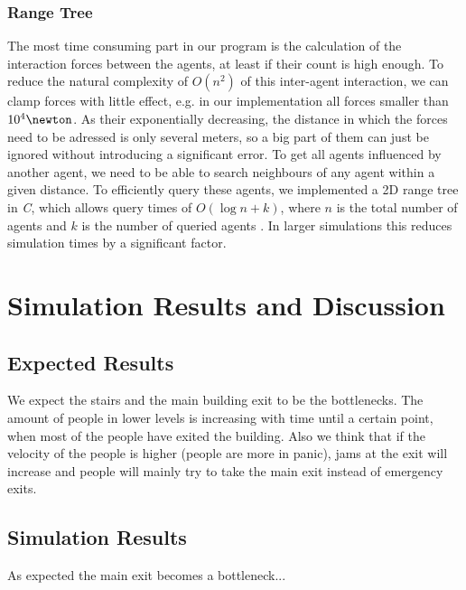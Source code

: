 \documentclass[11pt]{article}
\begin{document}
\subsubsection{Range Tree}
The most time consuming part in our program is the calculation of the interaction forces between the agents, at least if their count is high enough. To reduce the natural complexity of $O(n^{2})$ of this inter-agent interaction, we can clamp forces with little effect, e.g. in our implementation all forces smaller than $ 10^{4}\newton$. As their exponentially decreasing, the distance in which the forces need to be adressed is only several meters, so a big part of them can just be ignored without introducing a significant error.
To get all agents influenced by another agent, we need to be able to search neighbours of any agent within a given distance. To efficiently query these agents, we implemented a 2D range tree in \textit{C}, which allows query times of $O(\log n+k)$, where $n$ is the total number of agents and $k$ is the number of queried agents \cite{algdat}. In larger simulations this reduces simulation times by a significant factor.




\section{Simulation Results and Discussion}

\subsection{Expected Results}

We expect the stairs and the main building exit to be the bottlenecks. The
amount of people in lower levels is increasing with time until a certain point,
when most of the people have exited the building. Also we think that if the 
velocity of the people is higher (people are more in panic), jams at the
exit will increase and people will mainly try to take the main exit instead of
emergency exits.

\subsection{Simulation Results}

As expected the main exit becomes a bottleneck...
\end{document}
